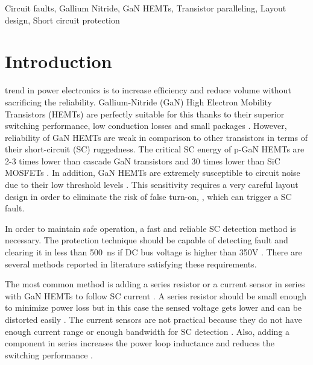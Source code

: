 \documentclass[journal]{IEEEtran}
\begin{document}
\begin{IEEEkeywords}
Circuit faults,
Gallium Nitride,
GaN HEMTs,
Transistor paralleling,
Layout design,
Short circuit protection
\end{IEEEkeywords}

\IEEEpeerreviewmaketitle

\section{Introduction}
\label{sec_intro}
 trend in power electronics is to increase efficiency and reduce volume without sacrificing the reliability. Gallium-Nitride (GaN) High Electron Mobility Transistors (HEMTs) are perfectly suitable for this thanks to their superior switching performance, low conduction losses and small packages \cite{Jones2016}. However, reliability of GaN HEMTs are weak in comparison to other transistors in terms of their short-circuit (SC) ruggedness. The critical SC energy of p-GaN HEMTs are 2-3 times lower than cascade GaN transistors and 30 times lower than SiC MOSFETs \cite{Mishemts2017, Badawi2016}. In addition, GaN HEMTs are extremely susceptible to circuit noise due to their low threshold levels \cite{Huang2014a}. This sensitivity requires a very careful layout design in order to eliminate the risk of false turn-on, \cite{Xie2017}, which can trigger a SC fault.

In order to maintain safe operation, a fast and reliable SC detection method is necessary. The protection technique should be capable of detecting fault and clearing it in less than 500~ns if DC bus voltage is higher than 350V \cite{Lyu2020}. There are several methods reported in literature satisfying these requirements.

The most common method is adding a series resistor or a current sensor in series with GaN HEMTs to follow SC current \cite{Acuna}. A series resistor should be small enough to minimize power loss but in this case the sensed voltage gets lower and can be distorted easily \cite{Huang2014a}. The current sensors are not practical because they do not have enough current range or enough bandwidth for SC detection \cite{Sun2018a}. Also, adding a component in series increases the power loop inductance and reduces the switching performance \cite{Hou2018a}.
\end{document}

